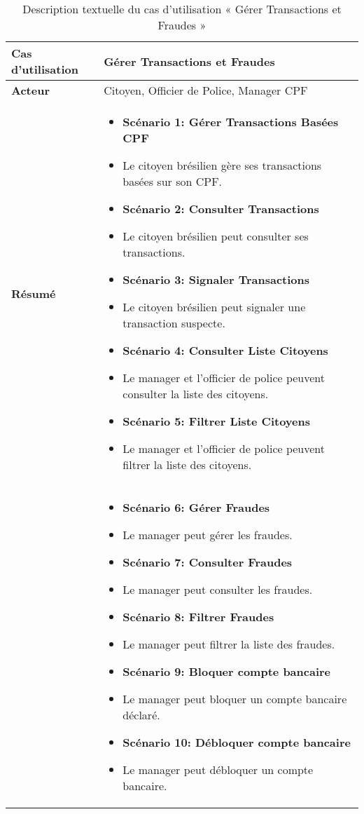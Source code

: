 \begin{longtable}{|>{\arraybackslash}p{4.2cm}|>{\arraybackslash}p{12.5cm}|}
\caption{\centering Description textuelle du cas d'utilisation « Gérer Transactions et Fraudes »}
\label{tab:backlog} \\
\hline
\rowcolor{gray!30}
\textbf{Cas d'utilisation} & Gérer Transactions et Fraudes \\
\hline
\endfirsthead

\hline
\endhead

\hline
\endfoot

\hline \hline
\endlastfoot
 \textbf{Acteur}  & Citoyen, Officier de Police, Manager CPF\\
\hline
\textbf{Résumé} &
\begin{itemize}[label=]
  \item\textbf{Scénario 1: Gérer Transactions Basées CPF}
  \item Le citoyen brésilien gère ses transactions basées sur son CPF.
  \item\textbf{Scénario 2: Consulter Transactions}
  \item Le citoyen brésilien peut consulter ses transactions.
  \item\textbf{Scénario 3: Signaler Transactions}
  \item Le citoyen brésilien peut signaler une transaction suspecte.
  \item\textbf{Scénario 4: Consulter Liste Citoyens}
  \item Le manager et l'officier de police peuvent consulter la liste des citoyens.
  \item\textbf{Scénario 5: Filtrer Liste Citoyens}
  \item Le manager et l'officier de police peuvent filtrer la liste des citoyens.

\end{itemize}\\

\hline


\textbf{}&
\begin{itemize}[label=]
\item\textbf{Scénario 6: Gérer Fraudes}
  \item Le manager peut gérer les fraudes.
  \item\textbf{Scénario 7: Consulter Fraudes}
  \item Le manager peut consulter les fraudes.
  \item\textbf{Scénario 8: Filtrer Fraudes}
  \item Le manager peut filtrer la liste des fraudes.
  \item\textbf{Scénario 9: Bloquer compte bancaire}
  \item Le manager peut bloquer un compte bancaire déclaré.
  \item\textbf{Scénario 10: Débloquer compte bancaire}
  \item Le manager peut débloquer un compte bancaire.


\end{itemize}
\end{longtable}
